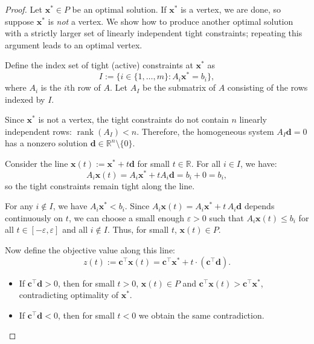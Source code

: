 \begin{proof}
Let \( \mathbf{x}^* \in P \) be an optimal solution. If \( \mathbf{x}^* \) is a vertex, we are done, so suppose \( \mathbf{x}^* \) is \emph{not} a vertex. We show how to produce another optimal solution with a strictly larger set of linearly independent tight constraints; repeating this argument leads to an optimal vertex.

Define the index set of tight (active) constraints at \( \mathbf{x}^* \) as
\[
I := \{ i \in \{1, \dots, m\} : A_i \mathbf{x}^* = b_i \},
\]
where \( A_i \) is the $i$th row of \( A \). Let \( A_I \) be the submatrix of \( A \) consisting of the rows indexed by \( I \).

Since \( \mathbf{x}^* \) is not a vertex, the tight constraints do not contain \( n \) linearly independent rows: \( \operatorname{rank}(A_I) < n \). Therefore, the homogeneous system \( A_I \mathbf{d} = 0 \) has a nonzero solution \( \mathbf{d} \in \mathbb{R}^n \setminus \{0\} \).

Consider the line \( \mathbf{x}(t) := \mathbf{x}^* + t \mathbf{d} \) for small \( t \in \mathbb{R} \). For all \( i \in I \), we have:
\[
A_i \mathbf{x}(t) = A_i \mathbf{x}^* + t A_i \mathbf{d} = b_i + 0 = b_i,
\]
so the tight constraints remain tight along the line.

For any \( i \notin I \), we have \( A_i \mathbf{x}^* < b_i \). Since \( A_i \mathbf{x}(t) = A_i \mathbf{x}^* + t \, A_i \mathbf{d} \) depends continuously on \( t \), we can choose a small enough \( \varepsilon > 0 \) such that \( A_i \mathbf{x}(t) \leq b_i \) for all \( t \in [-\varepsilon, \varepsilon] \) and all \( i \notin I \). Thus, for small \( t \), \( \mathbf{x}(t) \in P \).

Now define the objective value along this line: 
\[
z(t) := \mathbf{c}^\top \mathbf{x}(t) = \mathbf{c}^\top \mathbf{x}^* + t \cdot (\mathbf{c}^\top \mathbf{d}).
\]

\begin{itemize}
\item If \( \mathbf{c}^\top \mathbf{d} > 0 \), then for small \( t > 0 \), \( \mathbf{x}(t) \in P \) and \( \mathbf{c}^\top \mathbf{x}(t) > \mathbf{c}^\top \mathbf{x}^* \), contradicting optimality of \( \mathbf{x}^* \).
\item If \( \mathbf{c}^\top \mathbf{d} < 0 \), then for small \( t < 0 \) we obtain the same contradiction.
\end{itemize}


\end{proof}
